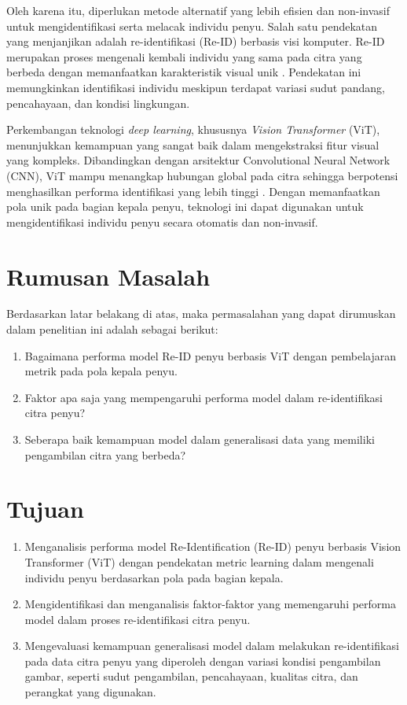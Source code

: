 Oleh karena itu, diperlukan metode alternatif yang lebih efisien dan non-invasif untuk mengidentifikasi serta melacak individu penyu.
Salah satu pendekatan yang menjanjikan adalah re-identifikasi (Re-ID) berbasis visi komputer.
Re-ID merupakan proses mengenali kembali individu yang sama pada citra yang berbeda dengan memanfaatkan karakteristik visual unik \cite{zheng2016personreidentificationpastpresent}.
Pendekatan ini memungkinkan identifikasi individu meskipun terdapat variasi sudut pandang, pencahayaan, dan kondisi lingkungan.

Perkembangan teknologi \textit{deep learning}, khususnya \textit{Vision Transformer} (ViT), menunjukkan kemampuan yang sangat baik dalam mengekstraksi fitur visual yang kompleks.
Dibandingkan dengan arsitektur Convolutional Neural Network (CNN), ViT mampu menangkap hubungan global pada citra sehingga berpotensi menghasilkan performa identifikasi yang lebih tinggi \cite{9716741}.
Dengan memanfaatkan pola unik pada bagian kepala penyu, teknologi ini dapat digunakan untuk mengidentifikasi individu penyu secara otomatis dan non-invasif.

\section{Rumusan Masalah}
Berdasarkan latar belakang di atas, maka permasalahan yang dapat dirumuskan dalam penelitian ini adalah sebagai berikut:
\begin{enumerate}
      \item Bagaimana performa model Re-ID penyu berbasis ViT dengan pembelajaran metrik pada pola kepala penyu.
      \item Faktor apa saja yang mempengaruhi performa model dalam re-identifikasi citra penyu?
      \item Seberapa baik kemampuan model dalam generalisasi data yang memiliki pengambilan citra yang berbeda?
\end{enumerate}

\section{Tujuan}
\begin{enumerate}
      \item Menganalisis performa model Re-Identification (Re-ID) penyu berbasis Vision Transformer (ViT) dengan pendekatan metric learning dalam mengenali individu penyu berdasarkan pola pada bagian kepala.
      \item Mengidentifikasi dan menganalisis faktor-faktor yang memengaruhi performa model dalam proses re-identifikasi citra penyu.
      \item Mengevaluasi kemampuan generalisasi model dalam melakukan re-identifikasi pada data citra penyu yang diperoleh dengan variasi kondisi pengambilan gambar, seperti sudut pengambilan, pencahayaan, kualitas citra, dan perangkat yang digunakan.
\end{enumerate}

